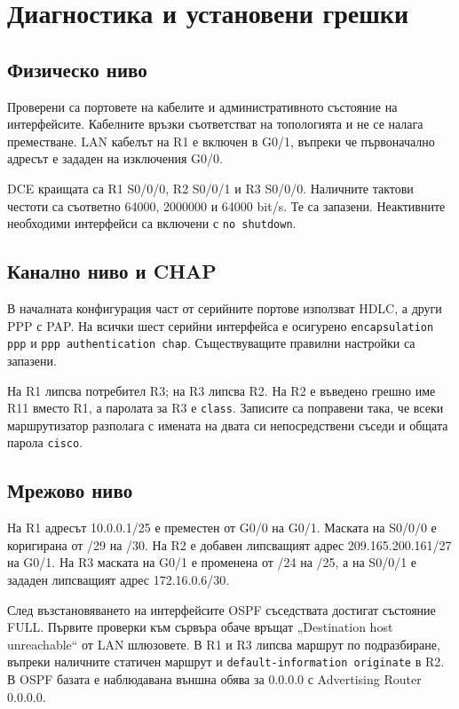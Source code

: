 \documentclass[12pt]{article}
\begin{document}
\section{Диагностика и установени грешки}
\subsection{Физическо ниво}
Проверени са портовете на кабелите и административното състояние на интерфейсите. Кабелните връзки съответстват на топологията и не се налага преместване. LAN кабелът на R1 е включен в G0/1, въпреки че първоначално адресът е зададен на изключения G0/0.

DCE краищата са R1 S0/0/0, R2 S0/0/1 и R3 S0/0/0. Наличните тактови честоти са съответно 64000, 2000000 и 64000 bit/s. Те са запазени. Неактивните необходими интерфейси са включени с \texttt{no shutdown}.

\subsection{Канално ниво и CHAP}
В началната конфигурация част от серийните портове използват HDLC, а други PPP с PAP. На всички шест серийни интерфейса е осигурено \texttt{encapsulation ppp} и \texttt{ppp authentication chap}. Съществуващите правилни настройки са запазени.

На R1 липсва потребител R3; на R3 липсва R2. На R2 е въведено грешно име R11 вместо R1, а паролата за R3 е \texttt{class}. Записите са поправени така, че всеки маршрутизатор разполага с имената на двата си непосредствени съседи и общата парола \texttt{cisco}.

\subsection{Мрежово ниво}
На R1 адресът 10.0.0.1/25 е преместен от G0/0 на G0/1. Маската на S0/0/0 е коригирана от /29 на /30. На R2 е добавен липсващият адрес 209.165.200.161/27 на G0/1. На R3 маската на G0/1 е променена от /24 на /25, а на S0/0/1 е зададен липсващият адрес 172.16.0.6/30.

След възстановяването на интерфейсите OSPF съседствата достигат състояние FULL. Първите проверки към сървъра обаче връщат „Destination host unreachable“ от LAN шлюзовете. В R1 и R3 липсва маршрут по подразбиране, въпреки наличните статичен маршрут и \texttt{default-information originate} в R2. В OSPF базата е наблюдавана външна обява за 0.0.0.0 с Advertising Router 0.0.0.0.
\end{document}
